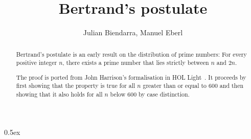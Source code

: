 \documentclass[11pt,a4paper]{article}
\begin{document}
\title{Bertrand's postulate}
\author{Julian Biendarra, Manuel Eberl}
\maketitle

\begin{abstract}
Bertrand's postulate is an early result on the distribution of prime numbers: 
For every positive integer $n$, there exists a prime number that lies strictly 
between $n$ and $2n$.

	The proof is ported from John Harrison's formalisation in HOL Light~\cite{hollight}. It proceeds 
by first showing that the property is true for all $n$ greater than or equal to 600 
and then showing that it also holds for all $n$ below 600 by case distinction.
\end{abstract}

\tableofcontents

\parindent 0pt\parskip 0.5ex




\begingroup
\raggedright

\endgroup
\end{document}
